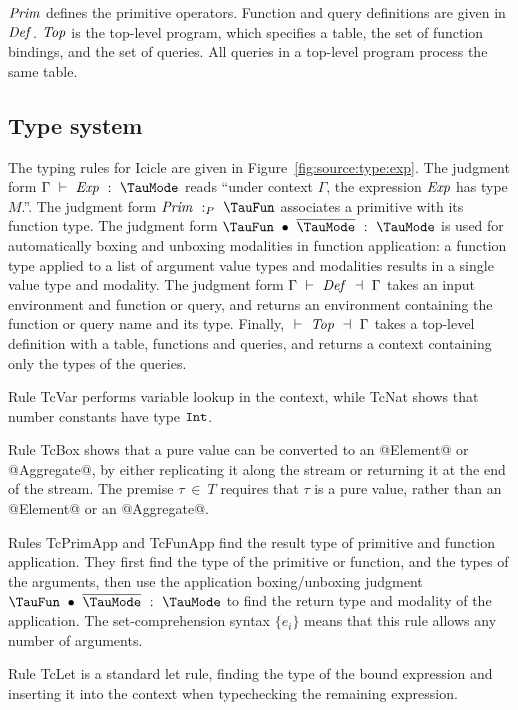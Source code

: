 $\mathit{Prim}$ defines the primitive operators.
Function and query definitions are given in $\mathit{Def}$. $\mathit{Top}$ is the top-level program, which specifies a table, the set of function bindings, and the set of queries. All queries in a top-level program process the same table.




\subsection{Type system}
The typing rules for Icicle are given in Figure~\ref{fig:source:type:exp}.
The judgment form $\Typecheck{\Gamma}{\mi{Exp}}{\TauMode}$ reads ``under context $\Gamma$, the expression $\mathit{Exp}$ has type $M$.''. 
The judgment form $\TypecheckP{\mi{Prim}}{\TauFun}$ associates a primitive with its function type.
The judgment form $\TypecheckApp{\TauFun}{\ov{\TauMode}}{\TauMode}$ is used for automatically boxing and unboxing modalities in function application: a function type applied to a list of argument value types and modalities results in a single value type and modality.
The judgment form $\TypecheckS{\Gamma}{\mi{Def}}{\Gamma}$ takes an input environment and function or query, and returns an environment containing the function or query name and its type.
Finally, $\TypecheckS{}{\mi{Top}}{\Gamma}$ takes a top-level definition with a table, functions and queries, and returns a context containing only the types of the queries.

Rule TcVar performs variable lookup in the context, while TcNat shows that number constants have type $\mathtt{Int}$.

Rule TcBox shows that a pure value can be converted to an @Element@ or @Aggregate@, by either replicating it along the stream or returning it at the end of the stream.
The premise $\tau~\in~T$ requires that $\tau$ is a pure value, rather than an @Element@ or an @Aggregate@.

Rules TcPrimApp and TcFunApp find the result type of primitive and function application.
They first find the type of the primitive or function, and the types of the arguments, then use the application boxing/unboxing judgment $\TypecheckApp{\TauFun}{\ov{\TauMode}}{\TauMode}$ to find the return type and modality of the application.
The set-comprehension syntax $\{e_i\}$ means that this rule allows any number of arguments.

Rule TcLet is a standard let rule, finding the type of the bound expression and inserting it into the context when typechecking the remaining expression.

